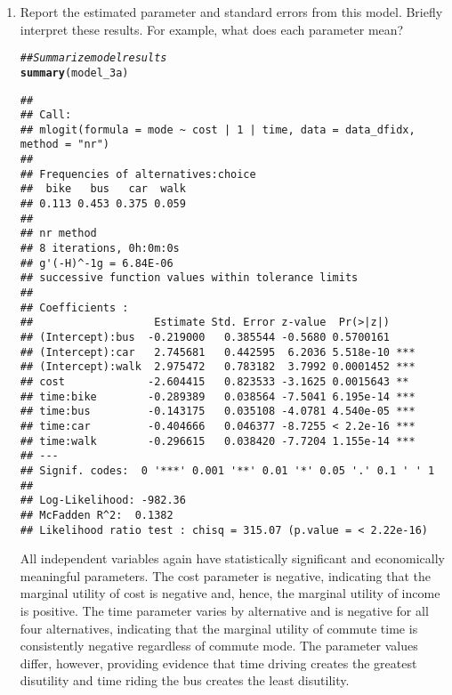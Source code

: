 \documentclass[11pt,letterpaper]{article}\usepackage[]{graphicx}\usepackage[]{color}
\makeatletter
\newcommand{\hlcom}[1]{\textcolor[rgb]{0.678,0.584,0.686}{\textit{#1}}}%
\newcommand{\hlstd}[1]{\textcolor[rgb]{0.345,0.345,0.345}{#1}}%
\newcommand{\hlkwd}[1]{\textcolor[rgb]{0.737,0.353,0.396}{\textbf{#1}}}%
\newenvironment{kframe}{%
 \def\at@end@of@kframe{}%
 \ifinner\ifhmode%
  \def\at@end@of@kframe{\end{minipage}}%
  \begin{minipage}{\columnwidth}%
 \fi\fi%
 \def\FrameCommand##1{\hskip\@totalleftmargin \hskip-\fboxsep
 \colorbox{shadecolor}{##1}\hskip-\fboxsep
     \hskip-\linewidth \hskip-\@totalleftmargin \hskip\columnwidth}%
 \MakeFramed {\advance\hsize-\width
   \@totalleftmargin\z@ \linewidth\hsize
   \@setminipage}}%
 {\par\unskip\endMakeFramed%
 \at@end@of@kframe}
\newenvironment{knitrout}{}{} %
\makeatother
\begin{document}
\begin{enumerate}[label=\alph*., leftmargin=*]
	\begin{enumerate}[label=\roman*.]
		\item Report the estimated parameter and standard errors from this model. Briefly interpret these results. For example, what does each parameter mean?

\begin{knitrout}
\color{fgcolor}\begin{kframe}
\begin{alltt}
\hlcom{## Summarize model results}
\hlkwd{summary}\hlstd{(model_3a)}
\end{alltt}
\begin{verbatim}
## 
## Call:
## mlogit(formula = mode ~ cost | 1 | time, data = data_dfidx, method = "nr")
## 
## Frequencies of alternatives:choice
##  bike   bus   car  walk 
## 0.113 0.453 0.375 0.059 
## 
## nr method
## 8 iterations, 0h:0m:0s 
## g'(-H)^-1g = 6.84E-06 
## successive function values within tolerance limits 
## 
## Coefficients :
##                   Estimate Std. Error z-value  Pr(>|z|)    
## (Intercept):bus  -0.219000   0.385544 -0.5680 0.5700161    
## (Intercept):car   2.745681   0.442595  6.2036 5.518e-10 ***
## (Intercept):walk  2.975472   0.783182  3.7992 0.0001452 ***
## cost             -2.604415   0.823533 -3.1625 0.0015643 ** 
## time:bike        -0.289389   0.038564 -7.5041 6.195e-14 ***
## time:bus         -0.143175   0.035108 -4.0781 4.540e-05 ***
## time:car         -0.404666   0.046377 -8.7255 < 2.2e-16 ***
## time:walk        -0.296615   0.038420 -7.7204 1.155e-14 ***
## ---
## Signif. codes:  0 '***' 0.001 '**' 0.01 '*' 0.05 '.' 0.1 ' ' 1
## 
## Log-Likelihood: -982.36
## McFadden R^2:  0.1382 
## Likelihood ratio test : chisq = 315.07 (p.value = < 2.22e-16)
\end{verbatim}
\end{kframe}
\end{knitrout}

		All independent variables again have statistically significant and economically meaningful parameters. The cost parameter is negative, indicating that the marginal utility of cost is negative and, hence, the marginal utility of income is positive. The time parameter varies by alternative and is negative for all four alternatives, indicating that the marginal utility of commute time is consistently negative regardless of commute mode. The parameter values differ, however, providing evidence that time driving creates the greatest disutility and time riding the bus creates the least disutility.


\end{enumerate}
\end{enumerate}
\end{document}
